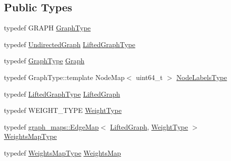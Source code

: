 \subsection*{Public Types}
\begin{DoxyCompactItemize}
\item 
typedef G\+R\+A\+P\+H \hyperlink{classnifty_1_1graph_1_1optimization_1_1lifted__multicut_1_1LiftedMulticutObjective_aefbd1898d3e4460d998f6116505adef0}{Graph\+Type}
\item 
typedef \hyperlink{classnifty_1_1graph_1_1UndirectedGraph}{Undirected\+Graph} \hyperlink{classnifty_1_1graph_1_1optimization_1_1lifted__multicut_1_1LiftedMulticutObjective_ad1dc4e746ffabb0ad64821f7259e2d75}{Lifted\+Graph\+Type}
\item 
typedef \hyperlink{classnifty_1_1graph_1_1optimization_1_1lifted__multicut_1_1LiftedMulticutObjective_aefbd1898d3e4460d998f6116505adef0}{Graph\+Type} \hyperlink{classnifty_1_1graph_1_1optimization_1_1lifted__multicut_1_1LiftedMulticutObjective_ad424be985627898c8af930ebc7c776f9}{Graph}
\item 
typedef Graph\+Type\+::template Node\+Map$<$ uint64\+\_\+t $>$ \hyperlink{classnifty_1_1graph_1_1optimization_1_1lifted__multicut_1_1LiftedMulticutObjective_a53aeb1cad2692cae4a6519931a616bba}{Node\+Labels\+Type}
\item 
typedef \hyperlink{classnifty_1_1graph_1_1optimization_1_1lifted__multicut_1_1LiftedMulticutObjective_ad1dc4e746ffabb0ad64821f7259e2d75}{Lifted\+Graph\+Type} \hyperlink{classnifty_1_1graph_1_1optimization_1_1lifted__multicut_1_1LiftedMulticutObjective_a3d3e69a6bc8de9a85497c8e4a1620815}{Lifted\+Graph}
\item 
typedef W\+E\+I\+G\+H\+T\+\_\+\+T\+Y\+P\+E \hyperlink{classnifty_1_1graph_1_1optimization_1_1lifted__multicut_1_1LiftedMulticutObjective_a0046f0b75a777244b728f103a53087a0}{Weight\+Type}
\item 
typedef \hyperlink{structnifty_1_1graph_1_1graph__maps_1_1EdgeMap}{graph\+\_\+maps\+::\+Edge\+Map}$<$ \hyperlink{classnifty_1_1graph_1_1optimization_1_1lifted__multicut_1_1LiftedMulticutObjective_a3d3e69a6bc8de9a85497c8e4a1620815}{Lifted\+Graph}, \hyperlink{classnifty_1_1graph_1_1optimization_1_1lifted__multicut_1_1LiftedMulticutObjective_a0046f0b75a777244b728f103a53087a0}{Weight\+Type} $>$ \hyperlink{classnifty_1_1graph_1_1optimization_1_1lifted__multicut_1_1LiftedMulticutObjective_a0417408f9d7f737edc3b97fe75c3373a}{Weights\+Map\+Type}
\item 
typedef \hyperlink{classnifty_1_1graph_1_1optimization_1_1lifted__multicut_1_1LiftedMulticutObjective_a0417408f9d7f737edc3b97fe75c3373a}{Weights\+Map\+Type} \hyperlink{classnifty_1_1graph_1_1optimization_1_1lifted__multicut_1_1LiftedMulticutObjective_a95340316f33714f1206080ff0e425f56}{Weights\+Map}
\end{DoxyCompactItemize}
